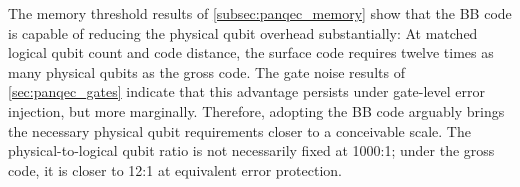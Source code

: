 The memory threshold results of \cref{subsec:panqec_memory} show that the BB code is capable of reducing the physical qubit overhead substantially: At matched logical qubit count and code distance, the surface code requires twelve times as many physical qubits as the gross code. The gate noise results of \cref{sec:panqec_gates} indicate that this advantage persists under gate-level error injection, but more marginally. Therefore, adopting the BB code arguably brings the necessary physical qubit requirements closer to a conceivable scale. The physical-to-logical qubit ratio is not necessarily fixed at 1000:1; under the gross code, it is closer to 12:1 at equivalent error protection.


